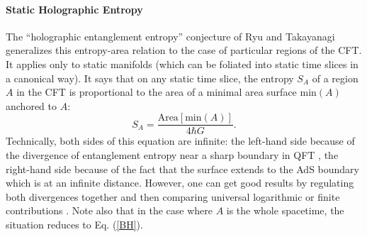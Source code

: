 \documentclass[12pt]{article}
\begin{document}
\paragraph{Static Holographic Entropy} The ``holographic entanglement entropy'' conjecture of Ryu and Takayanagi \cite{RT06} generalizes this entropy-area relation to the case of particular regions of the CFT.  It applies only to static manifolds (which can be foliated into static time slices in a canonical way).  It says that on any static time slice, the entropy $S_A$ of a region $A$ in the CFT is proportional to the area of a minimal area surface $\mathrm{min}(A)$ anchored to $A$:
\begin{equation}\label{minA}
S_{A} = \frac{\mathrm{Area}[\mathrm{min}(A)]}{4\hbar G}.
\end{equation}
Technically, both sides of this equation are infinite: the left-hand side because of the divergence of entanglement entropy near a sharp boundary in QFT \cite{diverge}, the right-hand side because of the fact that the surface extends to the AdS boundary which is at an infinite distance.  However, one can get good results by regulating both divergences together and then comparing universal logarithmic or finite contributions \cite{RT06}.  Note also that in the case where $A$ is the whole spacetime, the situation reduces to Eq. (\ref{BH}).  
\end{document}

